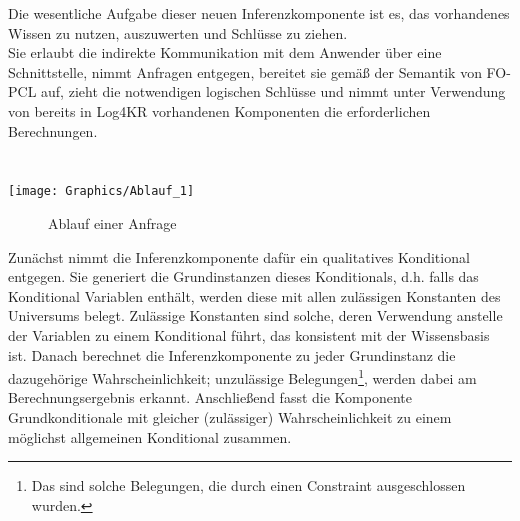 \documentclass[a4paper, 11pt]{book}
\begin{document}
Die wesentliche Aufgabe dieser neuen Inferenzkomponente ist es, das vorhandenes Wissen zu nutzen, auszuwerten und Schlüsse zu ziehen.\\
Sie erlaubt die indirekte Kommunikation mit dem Anwender über eine Schnittstelle, nimmt Anfragen entgegen, bereitet sie gemäß der Semantik von FO-PCL auf, zieht die notwendigen logischen Schlüsse und nimmt unter Verwendung von bereits in Log4KR vorhandenen Komponenten die erforderlichen Berechnungen.
\\
\\
\\ 
\texttt{[image: Graphics/Ablauf\_1]}
\begin{figure}[h]
	\caption{Ablauf einer Anfrage}
	\label{Ablauf}
\end{figure}
 
Zunächst nimmt die Inferenzkomponente dafür ein qualitatives Konditional entgegen. Sie generiert die Grundinstanzen dieses Konditionals, d.h. falls das Konditional Variablen enthält, werden diese mit allen zulässigen Konstanten des Universums belegt. Zulässige Konstanten sind solche, deren Verwendung anstelle der Variablen zu einem Konditional führt, das konsistent mit der Wissensbasis ist. Danach berechnet die Inferenzkomponente zu jeder Grundinstanz die dazugehörige Wahrscheinlichkeit; unzulässige Belegungen\footnote{Das sind solche Belegungen, die durch einen Constraint ausgeschlossen wurden.}, werden dabei am Berechnungsergebnis erkannt. Anschließend fasst die Komponente Grundkonditionale mit gleicher (zulässiger) Wahrscheinlichkeit zu einem möglichst allgemeinen Konditional zusammen.
\end{document}
